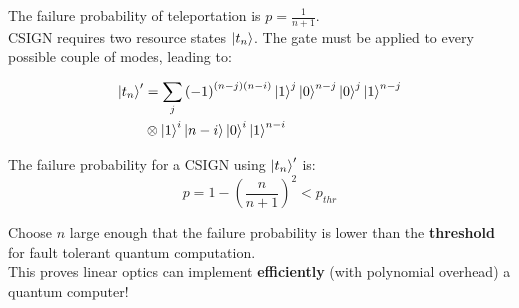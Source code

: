 \documentclass{beamer}
\begin{document}
\begin{frame}
\begin{center}
The failure probability of teleportation is $p = \frac{1}{n+1}$.\\
\vspace{10pt}
CSIGN requires two resource states $\ket{t_n}$. The gate must be applied to every possible couple of modes, leading to:

\begin{align*}
\ket{t_n}' & = \sum_{j} \left( -1 \right)^{\left( n-j \right) \left( n-i \right)} \ket{1}^{j} \ket{0}^{n-j} \ket{0}^j \ket{1}^{n-j} \\
& \otimes \ket{1}^{i} \ket{n-i} \ket{0}^i \ket{1}^{n-i}
\end{align*}

\end{center}
\end{frame}

\begin{frame}
\begin{center}
The failure probability for a CSIGN using $\ket{t_n}'$ is:
\begin{equation*}
p = 1-\left( \frac{n}{n+1} \right) ^2 < p_{thr}
\end{equation*}

Choose $n$ large enough that the failure probability is lower than the \textbf{threshold} for fault tolerant quantum computation.\\
\vspace{20pt}
This proves linear optics can implement \textbf{efficiently} (with polynomial overhead) a quantum computer!


\end{center}
\end{frame}
\end{document}
